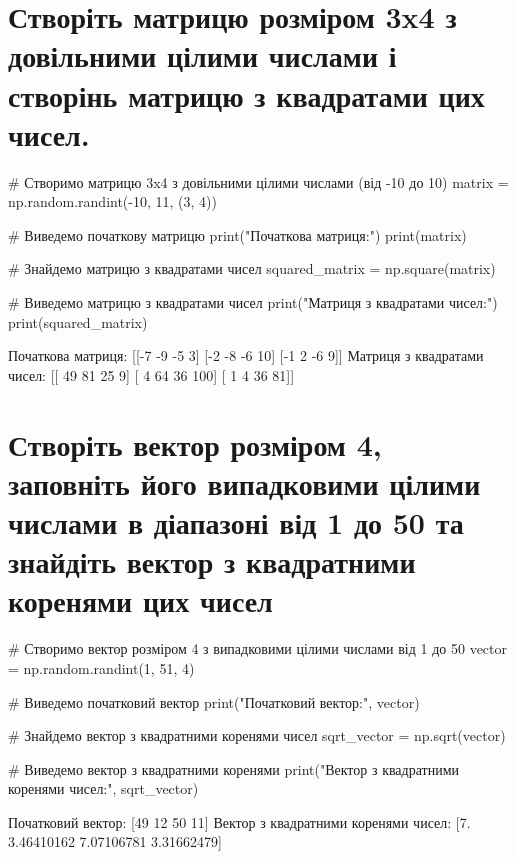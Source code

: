 \documentclass[]{article}
\newcounter{pythoncode}
\begin{document}
\section{Створіть матрицю розміром 3x4 з довільними цілими числами і створінь матрицю з квадратами цих чисел.}

\begin{pythoncode}
# Створимо матрицю 3x4 з довільними цілими числами (від -10 до 10)
matrix = np.random.randint(-10, 11, (3, 4))

# Виведемо початкову матрицю
print("Початкова матриця:")
print(matrix)

# Знайдемо матрицю з квадратами чисел
squared_matrix = np.square(matrix)

# Виведемо матрицю з квадратами чисел
print("Матриця з квадратами чисел:")
print(squared_matrix)
\end{pythoncode}

\begin{out}
	Початкова матриця:
	[[-7 -9 -5  3]
	 [-2 -8 -6 10]
	 [-1  2 -6  9]]
	Матриця з квадратами чисел:
	[[ 49  81  25   9]
	 [  4  64  36 100]
	 [  1   4  36  81]]
\end{out}

\section{Створіть вектор розміром 4, заповніть його випадковими цілими числами в діапазоні від 1 до 50 та знайдіть вектор з квадратними коренями цих чисел}

\begin{pythoncode}
    # Створимо вектор розміром 4 з випадковими цілими числами від 1 до 50
    vector = np.random.randint(1, 51, 4)

    # Виведемо початковий вектор
    print("Початковий вектор:", vector)

    # Знайдемо вектор з квадратними коренями чисел
    sqrt_vector = np.sqrt(vector)

    # Виведемо вектор з квадратними коренями
    print("Вектор з квадратними коренями чисел:", sqrt_vector)
\end{pythoncode}

\begin{out}
	Початковий вектор: [49 12 50 11]
	Вектор з квадратними коренями чисел: [7. 3.46410162 7.07106781 3.31662479]
\end{out}
\end{document}
